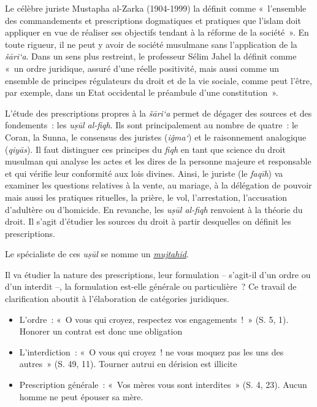 Le célèbre juriste Mustapha al-Zarka (1904-1999) la définit comme
«~l'ensemble des commandements et prescriptions dogmatiques et pratiques
que l'islam doit appliquer en vue de réaliser ses objectifs tendant à la
réforme de la société~». En toute rigueur, il ne peut y avoir de société musulmane sans
l'application de la \emph{šāri`a}. Dans un sens plus restreint, le
professeur Sélim Jahel la définit comme «~un ordre juridique, assuré
d'une réelle positivité, mais aussi comme un ensemble de principes
régulateurs du droit et de la vie sociale, comme peut l'être, par
exemple, dans un Etat occidental le préambule d'une
constitution~».

L'étude des prescriptions propres à la \emph{šāri`a} permet de dégager
des sources et des fondements~: les \emph{uṣūl al-fiqh}. Ils sont
principalement au nombre de quatre~: le Coran, la Sunna, le consensus
des juristes (\emph{iǧma`}) et le raisonnement analogique
(\emph{qiyās}). Il faut distinguer ces principes du \emph{fiqh} en tant
que science du droit musulman qui analyse les actes et les dires de la
personne majeure et responsable et qui vérifie leur conformité aux lois
divines. Ainsi, le juriste (le \emph{faqīh}) va examiner les questions
relatives à la vente, au mariage, à la délégation de pouvoir mais aussi
les pratiques rituelles, la prière, le vol, l'arrestation, l'accusation
d'adultère ou d'homicide. En revanche, les \emph{uṣūl al-fiqh} renvoient
à la théorie du droit. Il s'agit d'étudier les sources du droit à partir
desquelles on définit les prescriptions. 
\begin{Def}
Le spécialiste de ces
\emph{uṣūl} se nomme un
\href{https://fr.wikipedia.org/wiki/Mujtahid}{\emph{mujtahid}}.
\end{Def} 
Il va
étudier la nature des prescriptions, leur formulation -- s'agit-il d'un
ordre ou d'un interdit --, la formulation est-elle générale ou
particulière~? Ce travail de clarification aboutit à l'élaboration de
catégories juridiques.

\begin{itemize}
\item
  L'ordre~: «~O vous qui croyez, respectez vos engagements~!~» (S. 5, 1). Honorer un contrat est donc une obligation
 
 
\item
  L'interdiction~: «~O vous qui croyez~! ne vous moquez pas les uns des
  autres~» (S. 49, 11). Tourner autrui en dérision est illicite
 
\item
  Prescription générale~: «~Vos mères vous sont interdites~» (S. 4, 23). Aucun homme ne peut épouser sa mère.
\end{itemize}



